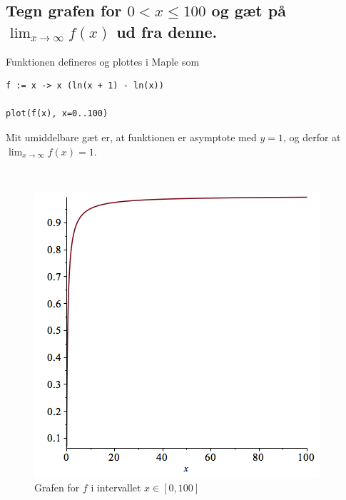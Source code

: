\documentclass[11pt,a4paper]{article}
\newcommand{\limit}[2]{\lim_{#1 \rightarrow #2}}
\begin{document}
\subsection
{
    \mdseries
    Tegn grafen for $0 < x \leq 100$ og gæt på $\limit{x}{\infty} f(x)$ ud
    fra denne.
}
\begin{multicols}{2}
    Funktionen defineres og plottes i Maple som
\begin{lstlisting}
f := x -> x (ln(x + 1) - ln(x))

plot(f(x), x=0..100)
\end{lstlisting}
    
    Mit umiddelbare gæt er, at funktionen er asymptote med $y = 1$, og derfor
    at $\limit{x}{\infty} f(x) = 1$.

    \vfill{\ }\columnbreak

    \begin{figure}[H]
        \includegraphics[scale=0.5]{figures/3-3(iii)a-1.png}
        \caption{Grafen for $f$ i intervallet $x \in [0,100]$}
        \label{fig:3.3(iii)a-1}
    \end{figure}

\end{multicols}


\end{document}
